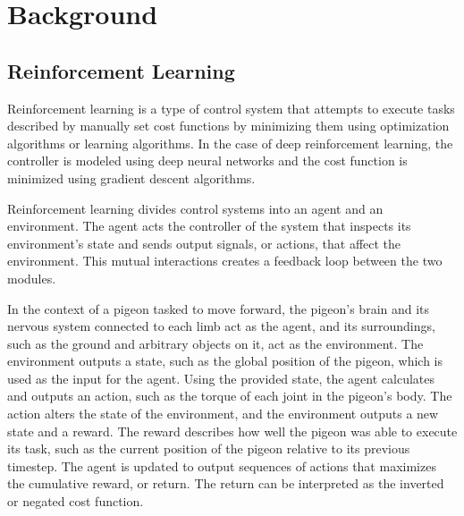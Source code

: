 \chapter{Background}
\section{Reinforcement Learning}
  Reinforcement learning is a type of control system that attempts to execute tasks described by manually set cost functions by minimizing them using optimization algorithms or learning algorithms. In the case of deep reinforcement learning, the controller is modeled using deep neural networks and the cost function is minimized using gradient descent algorithms.

  Reinforcement learning divides control systems into an agent and an environment. The agent acts the controller of the system that inspects its environment's state and sends output signals, or actions, that affect the environment. This mutual interactions creates a feedback loop between the two modules.

  In the context of a pigeon tasked to move forward, the pigeon's brain and its nervous system connected to each limb act as the agent, and its surroundings, such as the ground and arbitrary objects on it, act as the environment. The environment outputs a state, such as the global position of the pigeon, which is used as the input for the agent. Using the provided state, the agent calculates and outputs an action, such as the torque of each joint in the pigeon's body. The action alters the state of the environment, and the environment outputs a new state and a reward. The reward describes how well the pigeon was able to execute its task, such as the current position of the pigeon relative to its previous timestep. The agent is updated to output sequences of actions that maximizes the cumulative reward, or return. The return can be interpreted as the inverted or negated cost function.

